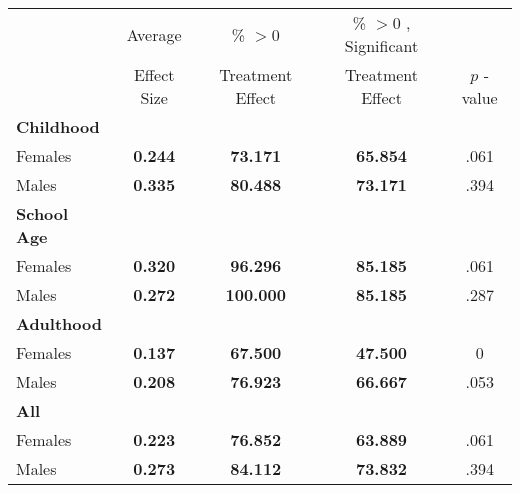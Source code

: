 \begin{tabular}{l c c c c}
\toprule
 & Average & \% $ >0 $ & \% $ >0 $ , Significant & \citet{Rosenbaum_2005_Distribution_JRSS} \\
 & Effect Size & Treatment Effect & Treatment Effect & $ p $ -value \\
\midrule
\textbf{Childhood} & & & & \\
\quad Females &  \textbf{    0.244} & \textbf{   73.171} & \textbf{   65.854} & .061 \\
\quad Males &  \textbf{    0.335} & \textbf{   80.488} & \textbf{   73.171} & .394 \\
\midrule
\textbf{School Age} & & & & \\
\quad Females &  \textbf{    0.320} & \textbf{   96.296} & \textbf{   85.185} & .061 \\
\quad Males &  \textbf{    0.272} & \textbf{  100.000} & \textbf{   85.185} & .287 \\
\midrule
\textbf{Adulthood} & & & & \\
\quad Females &  \textbf{    0.137} & \textbf{   67.500} & \textbf{   47.500} & 0 \\
\quad Males &  \textbf{    0.208} & \textbf{   76.923} & \textbf{   66.667} & .053 \\
\midrule
\textbf{All} & & & & \\
\quad Females &  \textbf{    0.223} & \textbf{   76.852} & \textbf{   63.889} & .061 \\
\quad Males &  \textbf{    0.273} & \textbf{   84.112} & \textbf{   73.832} & .394 \\
\bottomrule
\end{tabular}
